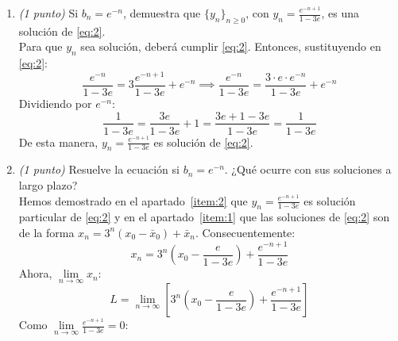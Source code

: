 \documentclass[12pt]{article}
\begin{document}
\begin{ejercicio}
\begin{enumerate}
\begin{itemize}
                \item Paso inductivo:
                Supongamos que la fórmula es válida para $n$ (Hipótesis de Inducción). Veamos si se cumple para $n+1$:
                $$x_{n+1} = 3x_n + b_n$$
                Aplicando la hipótesis de inducción en $x_n$:
                $$ x_{n+1} = 3 \left( 3^n x_0 + \sum_{i=0}^{n-1} 3^{n-1-i} b_i \right) + b_n $$
                Distribuyendo el factor 3:
                $$ x_{n+1} = 3^{n+1} x_0 + \sum_{i=0}^{n-1} 3^{n-i} b_i + b_n $$
                Nótese que el término $b_n$ puede reescribirse como $3^{n-n} b_n$ y añadirlo al sumatorio como el término correspondiente a $i=n$:
                $$ x_{n+1} = 3^{n+1} x_0 + \sum_{i=0}^{n} 3^{n-i} b_i $$
        \end{itemize}
        La fórmula queda demostrada para todo $n \ge 1$.
            \item \label{item:2}
            \emph{(1 punto)} Si $b_n = e^{-n}$, demuestra que $\{y_n\}_{n \ge 0}$, con $y_n = \displaystyle \frac{e^{-n+1}}{1-3e}$, es una solución de \eqref{eq:2}. \\
                Para que $y_n$ sea solución, deberá cumplir \eqref{eq:2}. Entonces, sustituyendo en \eqref{eq:2}:
                $$\frac{e^{-n}}{1-3e} = 3 \frac{e^{-n+1}}{1-3e} + e^{-n} \implies \frac{e^{-n}}{1-3e} = \frac{3 \cdot e \cdot e^{-n}}{1-3e} + e^{-n}$$
                Dividiendo por $e^{-n}$:
                $$\frac{1}{1-3e} = \frac{3e}{1-3e} + 1 = \frac{3e + 1 - 3e}{1-3e} = \frac{1}{1-3e}$$
                De esta manera, $y_n = \displaystyle \frac{e^{-n+1}}{1-3e}$ es solución de \eqref{eq:2}.
            \item\label{item:3}
            \emph{(1 punto)} Resuelve la ecuación si $b_n = e^{-n}$. ¿Qué ocurre con sus soluciones a largo plazo? \\
                Hemos demostrado en el apartado~\ref{item:2} que $y_n = \displaystyle \frac{e^{-n+1}}{1-3e}$ es solución particular de \eqref{eq:2} y en el apartado~\ref{item:1} que las soluciones de \eqref{eq:2} son de la forma $x_n = 3^n(x_0 - \bar{x}_0) + \bar{x}_n$. Consecuentemente:
                $$ x_n = 3^n \left( x_0 - \frac{e}{1-3e} \right) + \frac{e^{-n+1}}{1-3e} $$
                Ahora, $\lim\limits_{n \to \infty} x_n$:
                $$ L = \lim_{n \to \infty} \left[ 3^n \left( x_0 - \frac{e}{1-3e} \right) + \frac{e^{-n+1}}{1-3e} \right] $$
                Como $\lim\limits_{n \to \infty} \displaystyle \frac{e^{-n+1}}{1-3e} = 0$:
                \begin{itemize}

\end{itemize}
\end{enumerate}
\end{ejercicio}
\end{document}
